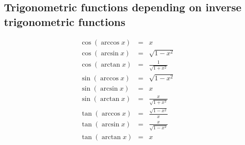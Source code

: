   \subsection{Trigonometric functions depending on inverse trigonometric functions}  

  \begin{eqnarray}
      \cos(\arccos x) &= & x                        \label{eq:cosarccos} \\
      \cos(\arcsin x) &= & \sqrt{1 - x^2}           \label{eq:cosarcsin} \\
      \cos(\arctan x) &= & \frac{1}{\sqrt{1 + x^2}} \label{eq:cosarctan} \\
      \sin(\arccos x) &= & \sqrt{1 - x^2}           \label{eq:sinarccos} \\
      \sin(\arcsin x) &= &  x                       \label{eq:sinarcsin} \\
      \sin(\arctan x) &= & \frac{x}{\sqrt{1 + x^2}} \label{eq:sinarctan} \\
      \tan(\arccos x) &= & \frac{\sqrt{1 - x^2}}{x} \label{eq:tanarccos} \\
      \tan(\arcsin x) &= & \frac{x}{\sqrt{1 - x^2}} \label{eq:tanarcsin} \\
      \tan(\arctan x) &= & x                        \label{eq:tanarctan}
  \end{eqnarray} 



